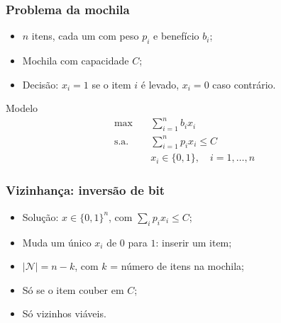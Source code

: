 \documentclass[fleqn]{beamer}
\newcommand{\vetor}[2]{%
	\foreach \v [count=\i] in {#2}{%
		\node[bit\v] at (\i*0.65,#1) {\v};
	}%
}
\newcommand{\destaque}[2]{%
	\draw[red,very thick] ({#2*0.65-0.3},{#1-0.3}) rectangle ({#2*0.65+0.3},{#1+0.3});
}
\begin{document}
\begin{frame}
	\frametitle{Problema da mochila}
	\begin{itemize}
		\item $n$ itens, cada um com peso $p_i$ e benefício $b_i$;
		\item Mochila com capacidade $C$;
		\item Decisão: $x_i = 1$ se o item $i$ é levado, $x_i = 0$ caso
			contrário.
	\end{itemize}
	\vspace{2mm}
	\begin{block}{Modelo}
		\vspace{-4mm}
		\begin{align*}
			\max \quad & \sum_{i=1}^{n} b_i x_i \\
			\text{s.a.} \quad & \sum_{i=1}^{n} p_i x_i \leq C \\
			& x_i \in \{0,1\}, \quad i = 1, \ldots, n
		\end{align*}
	\end{block}
\end{frame}

\begin{frame}
	\frametitle{Vizinhança: inversão de bit}
	\begin{center}
	\end{center}
	\begin{itemize}
		\item Solução: $x \in \{0,1\}^n$, com $\sum_i p_i x_i \leq C$;
		\item Muda um único $x_i$ de $0$ para $1$: inserir um item;
		\item $|\mathcal{N}| = n - k$, com $k$ = número de itens na mochila;
		\item Só se o item couber em $C$;
		\item Só vizinhos viáveis.
	\end{itemize}
\end{frame}
\end{document}
